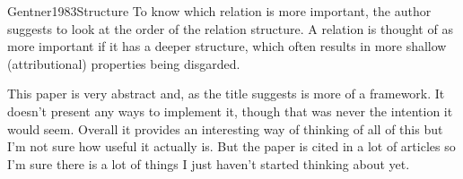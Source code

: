 \begin{review}{Gentner1983Structure}
    To know which relation is more important, the author suggests to look at the order of the relation structure.
    A relation is thought of as more important if it has a deeper structure, which often results in more shallow (attributional) properties being disgarded.
    
    This paper is very abstract and, as the title suggests is more of a framework.
    It doesn't present any ways to implement it, though that was never the intention it would seem.
    Overall it provides an interesting way of thinking of all of this but I'm not sure how useful it actually is.
    But the paper is cited in a lot of articles so I'm sure there is a lot of things I just haven't started thinking about yet.
\end{review}

